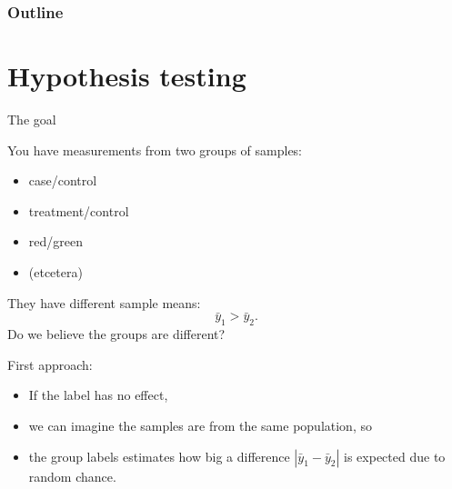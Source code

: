 %
%
%



\subtitle{hypothesis testing, and the $t$ statistic}

\date{2 March 2015}





\begin{frame}
  \maketitle
\end{frame}


\begin{frame}\frametitle<presentation>{Outline}
  \tableofcontents
\end{frame}


\section{Hypothesis testing}

\begin{frame}{The goal}

    You have measurements from two groups of samples:
    \begin{itemize}
        \item case/control
        \item treatment/control
        \item red/green
        \item (etcetera)
    \end{itemize}

    \vspace{2em}

    They have different \alert{sample} means:
    \[  \bar y_1 > \bar y_2 . \]
    Do we believe the groups are different?

    \vspace{2em}
    \pause

    \begin{block}{First approach:}
      \begin{itemize}
        \item If the label has no effect,
        \item we can imagine the samples are from the \alert{same population}, so
        \item {} the \alert{group labels}
          estimates how big a difference $|\bar y_1 - \bar y_2|$ is expected 
          due to random chance.
      \end{itemize}
    \end{block}

\end{frame}


